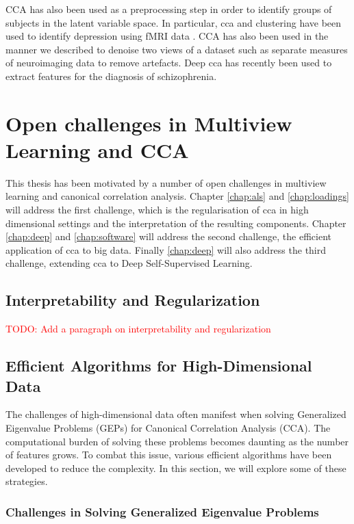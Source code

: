 CCA has also been used as a preprocessing step in order to identify groups of subjects in the latent variable space.
In particular, \acrshort{cca} and clustering have been used to identify depression using fMRI data \citep{dinga2019evaluating,drysdale2017resting}.
CCA has also been used in the manner we described to denoise two \gls{views} of a dataset such as separate measures of neuroimaging data \citep{zhuang2020technical} to remove artefacts.
Deep \acrshort{cca} has recently been used to extract features for the diagnosis of schizophrenia\citep{qi2016deep}.


\section{Open challenges in Multiview Learning and CCA}

This thesis has been motivated by a number of open challenges in multiview learning and canonical correlation analysis.
Chapter \ref{chap:als} and \ref{chap:loadings} will address the first challenge, which is the regularisation of \acrshort{cca} in high dimensional settings and the interpretation of the resulting components.
Chapter \ref{chap:deep} and \ref{chap:software} will address the second challenge, the efficient application of \acrshort{cca} to big data.
Finally \ref{chap:deep} will also address the third challenge, extending \acrshort{cca} to Deep Self-Supervised Learning.

\subsection{Interpretability and Regularization}

\textcolor{red}{TODO: Add a paragraph on interpretability and regularization}

\subsection{Efficient Algorithms for High-Dimensional Data}

The challenges of high-dimensional data often manifest when solving Generalized Eigenvalue Problems (GEPs) for Canonical Correlation Analysis (CCA). The computational burden of solving these problems becomes daunting as the number of features grows.
To combat this issue, various efficient algorithms have been developed to reduce the complexity.
In this section, we will explore some of these strategies.

\subsubsection{Challenges in Solving Generalized Eigenvalue Problems}

